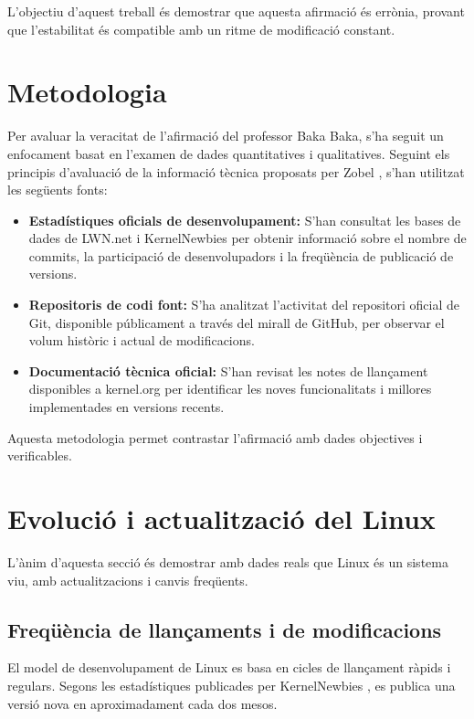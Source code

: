 \documentclass{article}
\begin{document}
L'objectiu d'aquest treball és demostrar que aquesta afirmació és errònia, provant que l'estabilitat és compatible amb un ritme de modificació constant.
\section{Metodologia}

Per avaluar la veracitat de l'afirmació del professor Baka Baka, s'ha seguit un enfocament basat en l'examen de dades quantitatives i qualitatives. Seguint els principis d'avaluació de la informació tècnica proposats per Zobel \cite{zobel_writing}, s'han utilitzat les següents fonts:

\begin{itemize}
    \item \textbf{Estadístiques oficials de desenvolupament:} S'han consultat les bases de dades de LWN.net i KernelNewbies per obtenir informació sobre el nombre de commits, la participació de desenvolupadors i la freqüència de publicació de versions.
    \item \textbf{Repositoris de codi font:} S'ha analitzat l'activitat del repositori oficial de Git, disponible públicament a través del mirall de GitHub, per observar el volum històric i actual de modificacions.
    \item \textbf{Documentació tècnica oficial:} S'han revisat les notes de llançament disponibles a kernel.org per identificar les noves funcionalitats i millores implementades en versions recents.
\end{itemize}

Aquesta metodologia permet contrastar l'afirmació amb dades objectives i verificables.

\section{Evolució i actualització del Linux}

L'ànim d'aquesta secció és demostrar amb dades reals que Linux és un sistema viu, amb actualitzacions i canvis freqüents.

\subsection{Freqüència de llançaments i de modificacions}

El model de desenvolupament de Linux es basa en cicles de llançament ràpids i regulars. Segons les estadístiques publicades per KernelNewbies \cite{kernelnewbies}, es publica una versió nova en aproximadament cada dos mesos.
\end{document}
